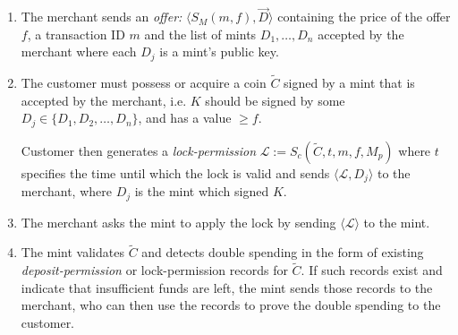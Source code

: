 \documentclass{llncs}
\begin{document}
\begin{enumerate}
\item\label{offer2} The merchant sends an \emph{offer:} $\langle S_M(m, f),
  \vec{D} \rangle$ containing the price of the offer $f$, a transaction
  ID $m$ and the list of mints $D_1, \ldots, D_n$ accepted by the merchant
  where each $D_j$ is a mint's public key.
\item\label{lock2} The customer must possess or acquire a coin $\widetilde{C}$ 
  signed by a mint that is
  accepted by the merchant, i.e. $K$ should be signed by some $D_j
  \in \{D_1, D_2, \ldots, D_n\}$, and has a value $\geq f$.

  Customer then generates a \emph{lock-permission} $\mathcal{L} :=
  S_c(\widetilde{C}, t, m, f, M_p)$ where $t$ specifies the time until which the
  lock is valid and sends $\langle \mathcal{L}, D_j\rangle$ to the merchant,
  where $D_j$ is the mint which signed $K$.
\item The merchant asks the mint to apply the lock by sending $\langle
  \mathcal{L} \rangle$ to the mint.
\item The mint validates $\widetilde{C}$ and detects double spending
  in the form of existing \emph{deposit-permission} or 
  lock-permission records for $\widetilde{C}$.  If such records exist
  and indicate that insufficient funds are left, the mint sends those
  records to the merchant, who can then use the records to prove the double
  spending to the customer.


\end{enumerate}
\end{document}
